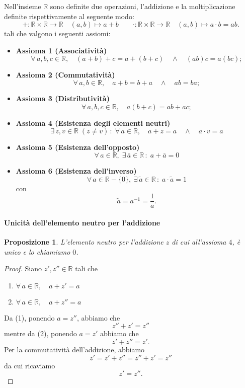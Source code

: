 \documentclass{article}
\theoremstyle{plain}
\newtheorem{prop}[thm]{Proposizione}
\theoremstyle{definition}
\theoremstyle{remark}
\begin{document}
Nell'insieme $\mathbb{R}$ sono definite due operazioni, l'addizione e la moltiplicazione definite rispettivamente al seguente modo:
\[+:\mathbb{R}\times \mathbb{R}\to \mathbb{R}\quad (a,b)\mapsto a+b\quad\quad\cdot:\mathbb{R}\times \mathbb{R}\to \mathbb{R}\quad (a,b)\mapsto a\cdot b=ab.\]
tali che valgono i seguenti assiomi:
\begin{itemize}
    \item[] \textbf{Assioma 1 (Associatività)}
    \[\forall\,a,b,c\in\mathbb{R},\quad(a+b)+c=a+(b+c)\quad\land\quad (ab)c=a(bc);\] 
    \item[] \textbf{Assioma 2 (Commutatività)}
    \[\forall\,a,b\in\mathbb{R},\quad a+b=b+a \quad\land\quad ab=ba;\]
    \item[] \textbf{Assioma 3 (Distributività)}
    \[\forall\,a,b,c\in\mathbb{R},\quad a(b+c)=ab+ac;\] 
    \item[] \textbf{Assioma 4 (Esistenza degli elementi neutri)}
    \[\exists\,z,v\in\mathbb{R}\;(z\neq v)\,:\;\forall\,a\in\mathbb{R},\quad a+z=a\quad\land\quad a\cdot v=a\]
    \item[] \textbf{Assioma 5 (Esistenza dell'opposto)}
    \[\forall\,a\in\mathbb{R},\;\exists\,\bar{a}\in\mathbb{R}\,:\;a+\bar{a}=0\]
    \item[] \textbf{Assioma 6 (Esistenza dell'inverso)}
    \[\forall\,a\in\mathbb{R}-\{0\},\;\exists\,\tilde{a}\in\mathbb{R}\,:\;a\cdot\tilde{a}=1\]
    con \[\tilde{a}=a^{-1}=\dfrac{1}{a}.\]
\end{itemize}

\vspace{10pt}

\paragraph{Unicità dell'elemento neutro per l'addizione}
\begin{bxthm}
\begin{prop}
    L'elemento neutro per l'addizione $z$ di cui all'assioma $4$, è unico e lo chiamiamo $0$.
\end{prop}
\end{bxthm}
\begin{proof}
    Siano $z',z''\in\mathbb{R}$ tali che 
    \begin{enumerate}
        \item $\forall\,a\in\mathbb{R},\quad a+z'=a$
        \item $\forall\,a\in\mathbb{R},\quad a+z''=a$
    \end{enumerate}
    Da (1), ponendo $a=z''$,  abbiamo che 
    \[z'' + z' = z''\]
    mentre da (2), ponendo $a=z'$ abbiamo che 
    \[z' + z'' = z'.\] 
    Per la commutatività dell'addizione, abbiamo 
    \[z' = z'+z'' = z''+z' = z''\]
    da cui ricaviamo
    \[z'=z''.\]
\end{proof}
\end{document}
